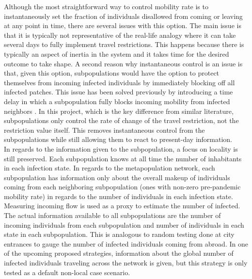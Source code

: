 Although the most straightforward way to control mobility rate is to instantaneously set the fraction of individuals disallowed from coming or leaving at any point in time, there are several issues with this option. The main issue is that it is typically not representative of the real-life analogy where it can take several days to fully implement travel restrictions. This happens because there is typically an aspect of inertia in the system and it takes time for the desired outcome to take shape. A second reason why instantaneous control is an issue is that, given this option, subpopulations would have the option to protect themselves from incoming infected individuals by immediately blocking off all infected patches. This issue has been solved previously by introducing a time delay in which a subpopulation fully blocks incoming mobility from infected neighbors \cite{feng2020infectious}. In this project, which is the key difference from similar literature, subpopulations only control the rate of change of the travel restriction, not the restriction value itself. This removes instantaneous control from the subpopulations while still allowing them to react to present-day information.\\

In regards to the information given to the subpopulation, a focus on locality is still preserved. Each subpopulation knows at all time the number of inhabitants in each infection state. In regards to the metapopulation network, each subpopulation has information only about the overall makeup of individuals coming from each neighboring subpopulation (ones with non-zero pre-pandemic mobility rate) in regards to the number of individuals in each infection state. Measuring incoming flow is used as a proxy to estimate the number of infected. The actual information available to all subpopulations are the number of incoming individuals from each subpopulation and number of individuals in each state in each subpopulation. This is analogous to random testing done at city entrances to gauge the number of infected individuals coming from abroad. In one of the upcoming proposed strategies, information about the global number of infected individuals traveling across the network is given, but this strategy is only tested as a default non-local case scenario.\\


